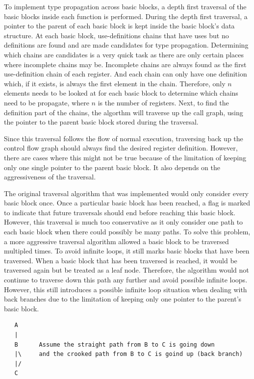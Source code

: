 To implement type propagation across basic blocks, a depth first traversal of 
the basic blocks inside each function is performed. During the depth first 
traversal, a pointer to the parent of each basic block is kept inside the 
basic block's data structure. At each basic block, use-definitions chains that 
have uses but no definitions are found and are made candidates for type 
propagation. Determining which chains are candidates is a very quick task as 
there are only certain places where incomplete chains may be. Incomplete 
chains are always found as the first use-definition chain of each register.
And each chain can only have one definition which, if it exists, is always 
the first element in the chain. Therefore, only $n$ elements needs to be looked 
at for each basic block to determine which chains need to be propagate, where 
$n$ is the number of registers. Next, to find the definition part of the 
chains, the algorthm will traverse up the call graph, using the pointer to 
the parent basic block stored during the traversal. 

Since this traversal follows the flow of normal execution, traversing back up 
the control flow graph should always find the desired register definition. 
However, there are cases where this might not be true because of the 
limitation of keeping only one single pointer to the parent basic block. It 
also depends on the aggressiveness of the traversal.

The original traversal algorithm that was implemented would only consider every
basic block once. Once a particular basic block has been reached, a flag is 
marked to indicate that future traversals should end before reaching this basic
block. However, this traversal is much too conservative as it only consider one
path to each basic block when there could possibly be many paths. To solve this 
problem, a more aggressive traversal algorithm allowed a basic block to be 
traversed multipled times. To avoid infinite loops, it still marks basic blocks
that have been traversed. When a basic block that has been traversed is reached,
it would be traversed again but be treated as a leaf node. Therefore, the 
algorithm would not continue to traverse down this path any further and avoid 
possible infinite loops. However, this still introduces a possible infinite 
loop situation when dealing with back branches due to the limitation of 
keeping only one pointer to the parent's basic block. 

\begin{verbatim}
   A
   |
   B      Assume the straight path from B to C is going down
   |\     and the crooked path from B to C is goind up (back branch)
   |/
   C
\end{verbatim}   
	  
